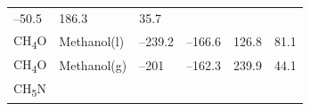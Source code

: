 \documentclass[
  9pt,
]{extbook}
\theoremstyle{definition}
\theoremstyle{definition}
\theoremstyle{definition}
\theoremstyle{remark}
\begin{document}
\begin{longtable}[]{@{}llllll@{}}
\begin{minipage}[t]{0.15\columnwidth}
--50.5\strut
\end{minipage} & \begin{minipage}[t]{0.14\columnwidth}\raggedright
186.3\strut
\end{minipage} & \begin{minipage}[t]{0.14\columnwidth}\raggedright
35.7\strut
\end{minipage}\tabularnewline
\begin{minipage}[t]{0.07\columnwidth}\raggedright
CH\textsubscript{4}O\strut
\end{minipage} & \begin{minipage}[t]{0.17\columnwidth}\raggedright
Methanol(l)\strut
\end{minipage} & \begin{minipage}[t]{0.15\columnwidth}\raggedright
--239.2\strut
\end{minipage} & \begin{minipage}[t]{0.15\columnwidth}\raggedright
--166.6\strut
\end{minipage} & \begin{minipage}[t]{0.14\columnwidth}\raggedright
126.8\strut
\end{minipage} & \begin{minipage}[t]{0.14\columnwidth}\raggedright
81.1\strut
\end{minipage}\tabularnewline
\begin{minipage}[t]{0.07\columnwidth}\raggedright
CH\textsubscript{4}O\strut
\end{minipage} & \begin{minipage}[t]{0.17\columnwidth}\raggedright
Methanol(g)\strut
\end{minipage} & \begin{minipage}[t]{0.15\columnwidth}\raggedright
--201\strut
\end{minipage} & \begin{minipage}[t]{0.15\columnwidth}\raggedright
--162.3\strut
\end{minipage} & \begin{minipage}[t]{0.14\columnwidth}\raggedright
239.9\strut
\end{minipage} & \begin{minipage}[t]{0.14\columnwidth}\raggedright
44.1\strut
\end{minipage}\tabularnewline
\begin{minipage}[t]{0.07\columnwidth}\raggedright
CH\textsubscript{5}N\strut
\end{minipage} & \begin{minipage}[t]{0.17\columnwidth}\raggedright

\end{minipage}
\end{longtable}
\end{document}
